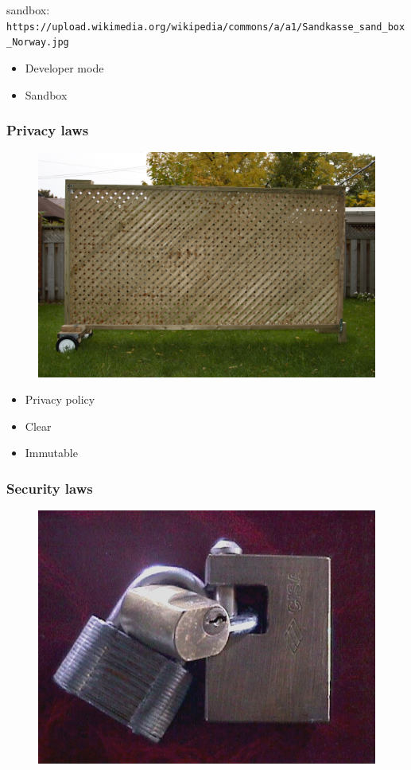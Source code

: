 sandbox: \verb|https://upload.wikimedia.org/wikipedia/commons/a/a1/Sandkasse_sand_box_Norway.jpg|

\begin{itemize}
\item Developer mode
\item Sandbox
\end{itemize}



\begin{frame}[fragile]
\frametitle{Privacy laws}

\begin{figure}
\includegraphics[scale=0.3]{screen}
\end{figure}

\end{frame}


\begin{itemize}
\item Privacy policy
\item Clear
\item Immutable
\end{itemize}


\begin{frame}[fragile]
\frametitle{Security laws}


\begin{figure}
\includegraphics{security}
\end{figure}

\end{frame}


